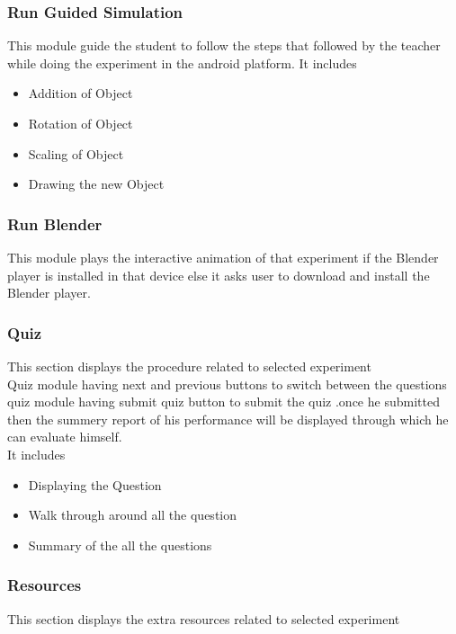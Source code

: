 \documentclass[12pt]{report}
\begin{document}
\subsubsection{Run Guided Simulation}

This module guide the student to follow the steps that followed by the teacher while doing the experiment in the android platform. It includes 

\begin{itemize}
\item Addition of Object
\item Rotation of Object
\item Scaling of Object
\item Drawing the new Object
\end{itemize}

\subsubsection{Run Blender}

This module plays the interactive animation of that experiment if the Blender player is installed in that device else it asks user to download and install the Blender player.

\subsubsection{Quiz}
This section displays the procedure related to selected experiment\\
Quiz module having next and previous buttons to switch between the questions quiz module having submit quiz button to submit the quiz .once he submitted then the summery report of his performance will be displayed through which he can evaluate himself.\\
It includes
\begin{itemize}
\item Displaying the Question
\item Walk through around all the question
\item Summary of the all the questions
\end{itemize}

\subsubsection{Resources}
This section displays the extra resources related to selected experiment

\pagebreak
\end{document}
